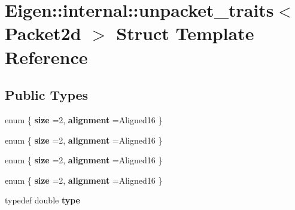 \hypertarget{struct_eigen_1_1internal_1_1unpacket__traits_3_01_packet2d_01_4}{}\section{Eigen\+:\+:internal\+:\+:unpacket\+\_\+traits$<$ Packet2d $>$ Struct Template Reference}
\label{struct_eigen_1_1internal_1_1unpacket__traits_3_01_packet2d_01_4}
\subsection*{Public Types}
\begin{DoxyCompactItemize}
\item 
\mbox{\label{struct_eigen_1_1internal_1_1unpacket__traits_3_01_packet2d_01_4_a0229776bf1298823fc76257abe6cb1ee}} 
enum \{ {\bfseries size} =2, 
{\bfseries alignment} =Aligned16
 \}
\item 
\mbox{\label{struct_eigen_1_1internal_1_1unpacket__traits_3_01_packet2d_01_4_a2a93794a1c33831105d5858e568010e1}} 
enum \{ {\bfseries size} =2, 
{\bfseries alignment} =Aligned16
 \}
\item 
\mbox{\label{struct_eigen_1_1internal_1_1unpacket__traits_3_01_packet2d_01_4_aacb4f955e3a31f0c53665fd8e8b12e07}} 
enum \{ {\bfseries size} =2, 
{\bfseries alignment} =Aligned16
 \}
\item 
\mbox{\label{struct_eigen_1_1internal_1_1unpacket__traits_3_01_packet2d_01_4_a59a3f250edf4abd17a198409662d2557}} 
enum \{ {\bfseries size} =2, 
{\bfseries alignment} =Aligned16
 \}
\item 
\mbox{\label{struct_eigen_1_1internal_1_1unpacket__traits_3_01_packet2d_01_4_ade249a255fbfe7ea4f99f773430eb5da}} 
typedef double {\bfseries type}
\item 
\mbox{\label{struct_eigen_1_1internal_1_1unpacket__traits_3_01_packet2d_01_4_af1820b9532d7c712b5d1d46fd94d2ea5}} 

\end{DoxyCompactItemize}
